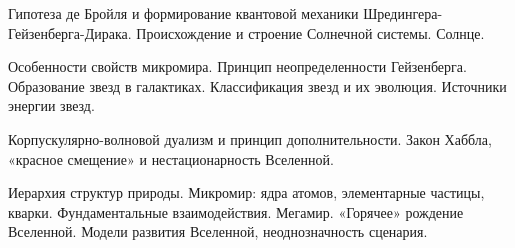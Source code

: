 \documentclass[
	14pt,
	a4paper,
	]
	{scrartcl}
\begin{document}
\vfill

\newpage


\shapk
{}
\setcounter{zad}{0}

\vfill
\z Гипотеза де Бройля и формирование квантовой механики Шредингера-Гейзенберга-Дирака.
 \vfill
\z Происхождение и строение Солнечной системы. Солнце.
 \vfill

\vfill

\newpage


\shapk
{}
\setcounter{zad}{0}

\vfill
\z Особенности свойств микромира. Принцип неопределенности Гейзенберга.
 \vfill
\z Образование звезд в галактиках. Классификация звезд и их эволюция. Источники энергии звезд.
 \vfill

\vfill

\newpage


\shapk
{}
\setcounter{zad}{0}

\vfill
\z Корпускулярно-волновой дуализм и принцип дополнительности.
 \vfill
\z Закон Хаббла, «красное смещение» и нестационарность Вселенной.
 \vfill

\vfill

\newpage


\shapk
{}
\setcounter{zad}{0}

\vfill
\z Иерархия структур природы. Микромир: ядра атомов, элементарные частицы, кварки. Фундаментальные взаимодействия.
 \vfill
\z Мегамир. «Горячее» рождение Вселенной. Модели развития Вселенной, неоднозначность сценария.
 \vfill

\vfill

\newpage
\end{document}
